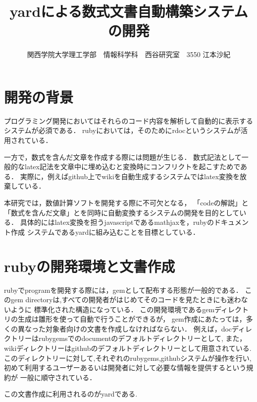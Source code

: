 \documentclass[10pt,a4j,twocolumn]{jsarticle}
\begin{document}
\title{yardによる数式文書自動構築システムの開発}
\author{関西学院大学理工学部　情報科学科　西谷研究室　3550 江本沙紀}
\date{}
\maketitle
\section{開発の背景}
プログラミング開発においてはそれらのコード内容を解析して自動的に表示するシステムが必須である．
rubyにおいては，そのためにrdocというシステムが活用されている．

一方で，数式を含んだ文章を作成する際には問題が生じる．
数式記法として一般的なlatex記法を文章中に埋め込むと変換時にコンフリクトを起こすためである．
実際に，例えばgithub上でwikiを自動生成するシステムではlatex変換を放棄している．

本研究では，数値計算ソフトを開発する際に不可欠となる，
「codeの解説」と「数式を含んだ文章」とを同時に自動変換するシステムの開発を目的としている．
具体的にはlatex変換を担うjavascriptであるmathjaxを，rubyのドキュメント作成
システムであるyardに組み込むことを目標としている．

\section{rubyの開発環境と文書作成}

rubyでprogramを開発する際には，gemとして配布する形態が一般的である．
このgem directoryは,すべての開発者がはじめてそのコードを見たときにも迷わないように
標準化された構造になっている．
この開発環境であるgemディレクトリの生成は雛形を使って自動で行うことができるが，
gem作成にあたっては，多くの異なった対象者向けの文書を作成しなければならない．
例えば，docディレクトリーはrubygemsでのdocumentのデフォルトディレクトリーとして,
また，wikiディレクトリーはgithubのデフォルトディレクトリーとして用意されている.
このディレクトリーに対して,それぞれのrubygems,githubシステムが操作を行い,
初めて利用するユーザーあるいは開発者に対して必要な情報を提供するという規約が
一般に順守されている．

この文書作成に利用されるのがyardである.
\end{document}
